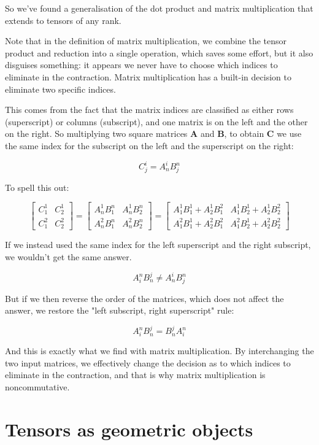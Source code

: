 So we've found a generalisation of the dot product and matrix multiplication that extends to tensors of any rank.

Note that in the definition of matrix multiplication, we combine the tensor product and reduction into a single operation, which saves some effort, but it also disguises something: it appears we never have to choose which indices to eliminate in the contraction. Matrix multiplication has a built-in decision to eliminate two specific indices.

This comes from the fact that the matrix indices are classified as either rows (superscript) or columns (subscript), and one matrix is on the left and the other on the right. So multiplying two square matrices $\boldsymbol{A}$ and $\boldsymbol{B}$, to obtain $\boldsymbol{C}$ we use the same index for the subscript on the left and the superscript on the right:

$$C^i_j = A^i_nB^n_j$$

To spell this out:

$$
\begin{bmatrix}C^1_1 & C^1_2 \\ C^2_1 & C^2_2\end{bmatrix}
= \begin{bmatrix}A^1_nB^n_1 & A^1_nB^n_2 \\ A^2_nB^n_1 & A^2_nB^n_2\end{bmatrix}
= \begin{bmatrix}A^1_1B^1_1 + A^1_2B^2_1 & A^1_1B^1_2 + A^1_2B^2_2 \\ A^2_1B^1_1 + A^2_2B^2_1 & A^2_1B^1_2 + A^2_2B^2_2\end{bmatrix}
$$

If we instead used the same index for the left superscript and the right subscript, we wouldn't get the same answer.

$$A^n_iB^j_n \ne A^i_nB^n_j$$

But if we then reverse the order of the matrices, which does not affect the answer, we restore the "left subscript, right superscript" rule:

$$A^n_iB^j_n = B^j_nA^n_i$$

And this is exactly what we find with matrix multiplication. By interchanging the two input matrices, we effectively change the decision as to which indices to eliminate in the contraction, and that is why matrix multiplication is noncommutative.

\section{Tensors as geometric objects}


